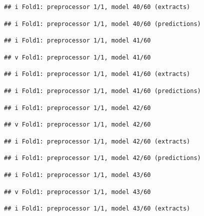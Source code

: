 \documentclass[
]{article}
\begin{document}
\begin{verbatim}
## i Fold1: preprocessor 1/1, model 40/60 (extracts)
\end{verbatim}

\begin{verbatim}
## i Fold1: preprocessor 1/1, model 40/60 (predictions)
\end{verbatim}

\begin{verbatim}
## i Fold1: preprocessor 1/1, model 41/60
\end{verbatim}

\begin{verbatim}
## v Fold1: preprocessor 1/1, model 41/60
\end{verbatim}

\begin{verbatim}
## i Fold1: preprocessor 1/1, model 41/60 (extracts)
\end{verbatim}

\begin{verbatim}
## i Fold1: preprocessor 1/1, model 41/60 (predictions)
\end{verbatim}

\begin{verbatim}
## i Fold1: preprocessor 1/1, model 42/60
\end{verbatim}

\begin{verbatim}
## v Fold1: preprocessor 1/1, model 42/60
\end{verbatim}

\begin{verbatim}
## i Fold1: preprocessor 1/1, model 42/60 (extracts)
\end{verbatim}

\begin{verbatim}
## i Fold1: preprocessor 1/1, model 42/60 (predictions)
\end{verbatim}

\begin{verbatim}
## i Fold1: preprocessor 1/1, model 43/60
\end{verbatim}

\begin{verbatim}
## v Fold1: preprocessor 1/1, model 43/60
\end{verbatim}

\begin{verbatim}
## i Fold1: preprocessor 1/1, model 43/60 (extracts)
\end{verbatim}
\end{document}
